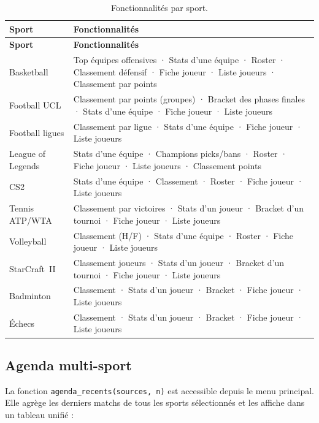 \documentclass[12pt,a4paper]{article}
\newcommand{\code}[1]{\texttt{#1}}
\begin{document}
\begin{center}
\begin{longtable}{lp{9cm}}
  \caption{Fonctionnalités par sport.}
  \label{tab:fonct}\\
  \toprule
  \textbf{Sport} & \textbf{Fonctionnalités} \\
  \midrule
  \endfirsthead
  \toprule
  \textbf{Sport} & \textbf{Fonctionnalités} \\
  \midrule
  \endhead
  \bottomrule
  \endfoot
  Basketball &
    Top équipes offensives · Stats d'une équipe · Roster ·
    Classement défensif · Fiche joueur · Liste joueurs · Classement par points \\
  Football UCL &
    Classement par points (groupes) · Bracket des phases finales ·
    Stats d'une équipe · Fiche joueur · Liste joueurs \\
  Football ligues &
    Classement par ligue · Stats d'une équipe · Fiche joueur · Liste joueurs \\
  League of Legends &
    Stats d'une équipe · Champions picks/bans · Roster ·
    Fiche joueur · Liste joueurs · Classement points \\
  CS2 &
    Stats d'une équipe · Classement · Roster ·
    Fiche joueur · Liste joueurs \\
  Tennis ATP/WTA &
    Classement par victoires · Stats d'un joueur ·
    Bracket d'un tournoi · Fiche joueur · Liste joueurs \\
  Volleyball &
    Classement (H/F) · Stats d'une équipe · Roster ·
    Fiche joueur · Liste joueurs \\
  StarCraft~II &
    Classement joueurs · Stats d'un joueur ·
    Bracket d'un tournoi · Fiche joueur · Liste joueurs \\
  Badminton &
    Classement · Stats d'un joueur · Bracket ·
    Fiche joueur · Liste joueurs \\
  Échecs &
    Classement · Stats d'un joueur · Bracket ·
    Fiche joueur · Liste joueurs \\
\end{longtable}
\end{center}

\subsection{Agenda multi-sport}

La fonction \code{agenda\_recents(sources, n)} est accessible depuis le menu
principal. Elle agrège les derniers matchs de tous les sports sélectionnés et
les affiche dans un tableau unifié :
\end{document}
